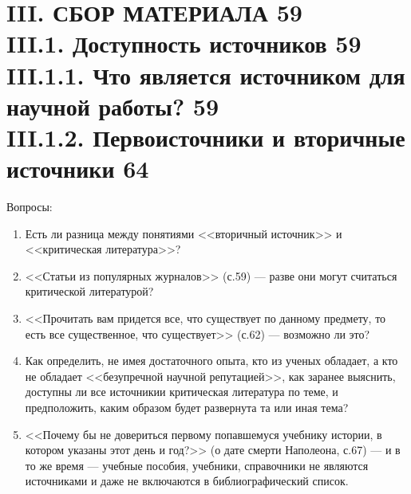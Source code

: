 \documentclass{../../common/thesisbyxetex}
\begin{document}
\section*{III. \uppercase{Сбор материала} 59 \\
III.1. Доступность источников 59 \\
III.1.1. Что является источником для научной работы? 59 \\
III.1.2. Первоисточники и вторичные источники 64}
Вопросы:
\begin{enumerate}
\item Есть ли разница между понятиями <<вторичный источник>> и <<критическая литература>>?

\item <<Статьи из популярных журналов>> (с.59) --- разве они могут считаться критической литературой?

\item <<Прочитать вам придется все, что существует по данному предмету, то есть все существенное, что существует>>
(с.62) --- возможно ли это?

\item Как определить, не имея достаточного опыта, кто из ученых обладает, а кто не обладает <<безупречной научной
репутацией>>, как заранее выяснить, доступны ли все источникии критическая литература по теме, и предположить, каким
образом будет развернута та или иная тема?

\item <<Почему бы не довериться первому попавшемуся учебнику истории, в котором указаны этот день и год?>> (о дате
смерти Наполеона, с.67) --- и в то же время --- учебные пособия, учебники, справочники не являются источниками и даже
не включаются в библиографический список.

\end{enumerate}
\end{document}
